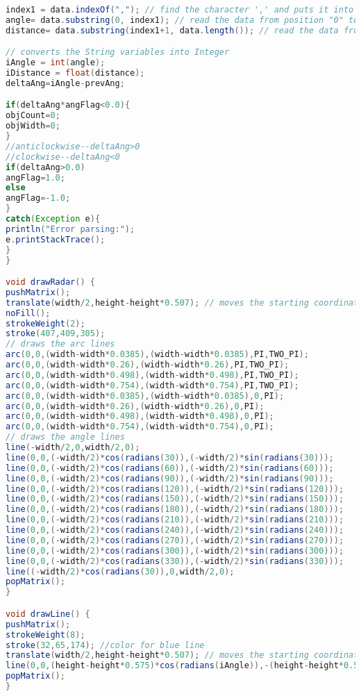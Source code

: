\begin{mdframed}[backgroundcolor=light-gray, roundcorner=10pt,leftmargin=1, rightmargin=1, innerleftmargin=15, innertopmargin=15,innerbottommargin=15, outerlinewidth=1, linecolor=light-gray]
\begin{lstlisting}[caption={The Processing Code}, language=Java]
index1 = data.indexOf(","); // find the character ',' and puts it into the variable "index1"
angle= data.substring(0, index1); // read the data from position "0" to position of the variable index1 or thats the value of the angle the Arduino Board sent into the Serial Port
distance= data.substring(index1+1, data.length()); // read the data from position "index1" to the end of the data pr thats the value of the distance

// converts the String variables into Integer
iAngle = int(angle);
iDistance = float(distance);
deltaAng=iAngle-prevAng;

if(deltaAng*angFlag<0.0){
objCount=0;
objWidth=0;
}
//anticlockwise--deltaAng>0
//clockwise--deltaAng<0    
if(deltaAng>0.0)
angFlag=1.0;
else
angFlag=-1.0;
}
catch(Exception e){
println("Error parsing:");
e.printStackTrace();
}
}

void drawRadar() {
pushMatrix();
translate(width/2,height-height*0.507); // moves the starting coordinates to new location
noFill();
strokeWeight(2);
stroke(407,409,305);
// draws the arc lines
arc(0,0,(width-width*0.0385),(width-width*0.0385),PI,TWO_PI);
arc(0,0,(width-width*0.26),(width-width*0.26),PI,TWO_PI);
arc(0,0,(width-width*0.498),(width-width*0.498),PI,TWO_PI);
arc(0,0,(width-width*0.754),(width-width*0.754),PI,TWO_PI);
arc(0,0,(width-width*0.0385),(width-width*0.0385),0,PI);
arc(0,0,(width-width*0.26),(width-width*0.26),0,PI);
arc(0,0,(width-width*0.498),(width-width*0.498),0,PI);
arc(0,0,(width-width*0.754),(width-width*0.754),0,PI);
// draws the angle lines
line(-width/2,0,width/2,0);
line(0,0,(-width/2)*cos(radians(30)),(-width/2)*sin(radians(30)));
line(0,0,(-width/2)*cos(radians(60)),(-width/2)*sin(radians(60)));
line(0,0,(-width/2)*cos(radians(90)),(-width/2)*sin(radians(90)));
line(0,0,(-width/2)*cos(radians(120)),(-width/2)*sin(radians(120)));
line(0,0,(-width/2)*cos(radians(150)),(-width/2)*sin(radians(150)));
line(0,0,(-width/2)*cos(radians(180)),(-width/2)*sin(radians(180)));
line(0,0,(-width/2)*cos(radians(210)),(-width/2)*sin(radians(210)));
line(0,0,(-width/2)*cos(radians(240)),(-width/2)*sin(radians(240)));
line(0,0,(-width/2)*cos(radians(270)),(-width/2)*sin(radians(270)));
line(0,0,(-width/2)*cos(radians(300)),(-width/2)*sin(radians(300)));
line(0,0,(-width/2)*cos(radians(330)),(-width/2)*sin(radians(330)));
line((-width/2)*cos(radians(30)),0,width/2,0);
popMatrix();
}

void drawLine() {
pushMatrix();
strokeWeight(8);
stroke(32,65,174); //color for blue line
translate(width/2,height-height*0.507); // moves the starting coordinates to new location
line(0,0,(height-height*0.575)*cos(radians(iAngle)),-(height-height*0.575)*sin(radians(iAngle))); // draws the line according to the angle
popMatrix();
}


\end{lstlisting}
\end{mdframed}
